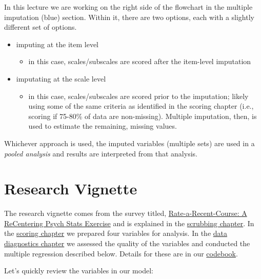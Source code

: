 \documentclass[
  11pt,
]{book}
\providecommand{\tightlist}{%
  \setlength{\itemsep}{0pt}\setlength{\parskip}{0pt}}
\begin{document}
In this lecture we are working on the right side of the flowchart in the multiple imputation (blue) section. Within it, there are two options, each with a slightly different set of options.

\begin{itemize}
\tightlist
\item
  imputing at the item level

  \begin{itemize}
  \tightlist
  \item
    in this case, scales/subscales are scored after the item-level imputation
  \end{itemize}
\item
  imputating at the scale level

  \begin{itemize}
  \tightlist
  \item
    in this case, scales/subscales are scored prior to the imputation; likely using some of the same criteria as identified in the scoring chapter (i.e., scoring if 75-80\% of data are non-missing). Multiple imputation, then, is used to estimate the remaining, missing values.
  \end{itemize}
\end{itemize}

Whichever approach is used, the imputed variables (multiple sets) are used in a \emph{pooled analysis} and results are interpreted from that analysis.

\hypertarget{research-vignette-3}{%
\section{Research Vignette}\label{research-vignette-3}}

The research vignette comes from the survey titled, \href{https://spupsych.az1.qualtrics.com/jfe/form/SV_b2cClqAlLGQ6nLU}{Rate-a-Recent-Course: A ReCentering Psych Stats Exercise} and is explained in the \protect\hyperlink{scrub}{scrubbing chapter}. In the \protect\hyperlink{score}{scoring chapter} we prepared four variables for analysis. In the \protect\hyperlink{DataDx}{data diagnostics chapter} we assessed the quality of the variables and conducted the multiple regression described below. Details for these are in our \href{./Rate-a-Course_Codebook.pdf}{codebook}.

Let's quickly review the variables in our model:
\end{document}
